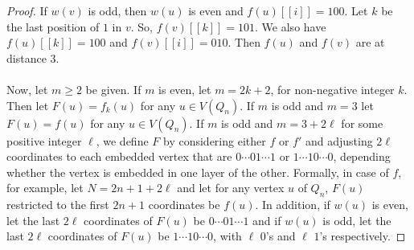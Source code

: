\documentclass[10pt,a4paper]{amsart}
\begin{document}
\begin{proof}
If $w(v)$ is odd, then $w(u)$ is even and $f(u)[[i]]=100$. 
Let $k$ be the last position of $1$ in $v$. So, $f(v)[[k]]= 101$. 
We also have $f(u)[[k]]=100$ and $f(v)[[i]]= 010$. Then $f(u)$ and $f(v)$ are at distance $3$.\\~\\


Now, let $m\geq 2$ be given. If $m$ is even, let $m=2k+2$, for non-negative integer $k$. Then let $F(u) = f_k(u)$ for any $u\in V(Q_n)$. 
If $m$ is odd and $m=3$ let $F(u) = f(u)$ for any $u\in V(Q_n)$. 
If $m$ is odd and $m= 3 +2\ell$ for some positive integer $\ell$, we define $F$ by considering either $f$ or $f'$ and adjusting $2\ell$ coordinates to each embedded vertex 
that are $0\cdots 0 1 \cdots 1$ or $ 1\cdots 1 0\cdots 0$, depending whether the vertex is embedded in one layer of the other. 
Formally, in case of $f$, for example, let  $N= 2n+1+ 2\ell$ and let for any vertex $u$ of $Q_n$, $F(u)$ restricted to the first $2n+1$ coordinates be $f(u)$. 
In addition, if $w(u)$ is even, let the last $2\ell$ coordinates of $F(u)$ be $0\cdots 0 1 \cdots 1$ and 
if $w(u)$ is odd, let the last $2\ell$ coordinates of $F(u)$ be $1\cdots 1 0 \cdots 0$,  with $\ell$ $0$'s and $\ell$ $1$'s respectively. 
\end{proof}
\end{document}
